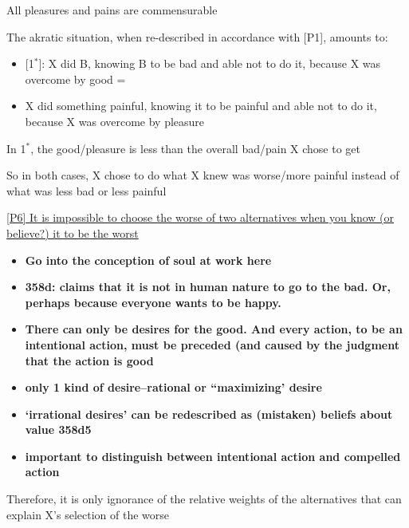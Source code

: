 \documentclass[11pt]{article}
\begin{document}
\noindent [P2] All pleasures and pains are commensurable
\vspace*{2mm}

\noindent [P3] The akratic situation, when re-described in accordance with [P1], amounts to:

\begin{itemize}
\item{[1$^{*}$]: X did B, knowing B to be bad and able not to do it, because X was overcome by good =}
\item{X did something painful, knowing it to be painful and able not to do it, because X was overcome by pleasure}\end{itemize}
\vspace*{2mm}
 
 \noindent [P4] In 1$^{*}$, the good/pleasure is less than the overall bad/pain X chose to get
 \vspace*{2mm}
 
 \noindent [P5] So in both cases, X chose to do what X knew was worse/more painful instead of what was less bad or less painful
 \vspace*{2mm}
 
 \noindent \underline{[P6] It is impossible to choose the worse of two alternatives when you know (or believe?) it to be the worst}
 
 \begin{itemize}\item{\textbf{Go into the conception of soul at work here}}\item{\textbf{358d: claims that it is not in human nature to go to the bad. Or, perhaps because everyone wants to be happy.}}\item{\textbf{There can only be desires for the good. And every action, to be an intentional action, must be preceded (and caused by the judgment that the action is good}}\item{\textbf{only 1 kind of desire--rational or ``maximizing' desire}}\item{\textbf{`irrational desires' can be redescribed as (mistaken) beliefs about value 358d5}}\item{\textbf{important to distinguish between intentional action and compelled action}}\end{itemize}
 
 \vspace*{2mm}
 
 \noindent [C] Therefore, it is only ignorance of the relative weights of the alternatives that can explain X's selection of the worse
\vspace*{2mm}
 
\end{document}
